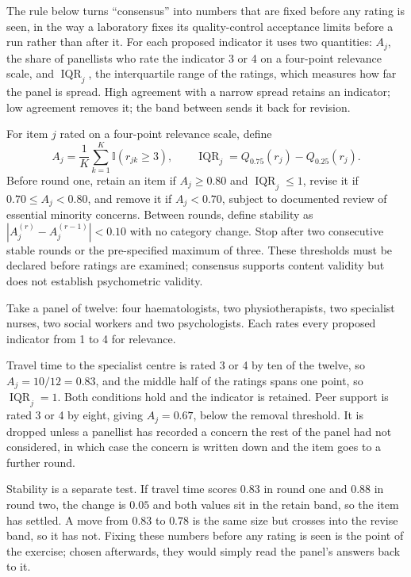 The rule below turns ``consensus'' into numbers that are fixed before any rating is seen, in the way a laboratory fixes its quality-control acceptance limits before a run rather than after it. For each proposed indicator it uses two quantities: $A_j$, the share of panellists who rate the indicator 3 or 4 on a four-point relevance scale, and $\operatorname{IQR}_j$, the interquartile range of the ratings, which measures how far the panel is spread. High agreement with a narrow spread retains an indicator; low agreement removes it; the band between sends it back for revision.

\begin{derivation}
\label{der:consensus}
For item $j$ rated on a four-point relevance scale, define
\[
 A_j=\frac{1}{K}\sum_{k=1}^{K}\mathbb I(r_{jk}\geq3),
 \qquad \operatorname{IQR}_j=Q_{0.75}(r_j)-Q_{0.25}(r_j).
\]
Before round one, retain an item if $A_j\geq0.80$ and
$\operatorname{IQR}_j\leq1$, revise it if $0.70\leq A_j<0.80$, and remove it if
$A_j<0.70$, subject to documented review of essential minority concerns. Between
rounds, define stability as $|A_j^{(r)}-A_j^{(r-1)}|<0.10$ with no category change.
Stop after two consecutive stable rounds or the pre-specified maximum of three.
These thresholds must be declared before ratings are examined; consensus supports
content validity but does not establish psychometric validity.
\end{derivation}

\begin{reading}
Take a panel of twelve: four haematologists, two physiotherapists, two
specialist nurses, two social workers and two psychologists. Each rates every
proposed indicator from 1 to 4 for relevance.

Travel time to the specialist centre is rated 3 or 4 by ten of the twelve, so
$A_j=10/12=0.83$, and the middle half of the ratings spans one point, so
$\operatorname{IQR}_j=1$. Both conditions hold and the indicator is retained.
Peer support is rated 3 or 4 by eight, giving $A_j=0.67$, below the removal
threshold. It is dropped unless a panellist has recorded a concern the rest of
the panel had not considered, in which case the concern is written down and the
item goes to a further round.

Stability is a separate test. If travel time scores $0.83$ in round one and
$0.88$ in round two, the change is $0.05$ and both values sit in the retain
band, so the item has settled. A move from $0.83$ to $0.78$ is the same size
but crosses into the revise band, so it has not. Fixing these numbers before
any rating is seen is the point of the exercise; chosen afterwards, they would
simply read the panel's answers back to it.
\end{reading}

